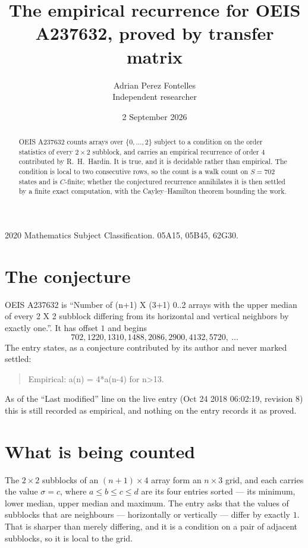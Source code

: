 \documentclass[11pt,a4paper]{article}
\title{The empirical recurrence for OEIS A237632, proved by transfer matrix}
\author{Adrian Perez Fontelles\\ \small Independent researcher}
\date{2 September 2026}
\theoremstyle{plain}
\theoremstyle{definition}
\begin{document}
\maketitle

\begin{abstract}
OEIS A237632 counts arrays over $\{0,\dots,2\}$ subject to a condition on the order
statistics of every $2\times2$ subblock, and carries an empirical recurrence of order
$4$ contributed by R.~H.~Hardin. It is true, and it is decidable rather than empirical.
The condition is local to two consecutive rows, so the count is a walk count on $S=702$
states and is $C$-finite; whether the conjectured recurrence annihilates it is then settled by
a finite exact computation, with the Cayley--Hamilton theorem bounding the work.
\end{abstract}

\noindent\small 2020 Mathematics Subject Classification. 05A15, 05B45, 62G30.\normalsize

\section{The conjecture}

OEIS A237632 is ``Number of (n+1) X (3+1) 0..2 arrays with the upper median of every 2 X 2 subblock differing from its horizontal and vertical neighbors by exactly one.''. It has offset $1$ and begins
\[
702, 1220, 1310, 1488, 2086, 2900, 4132, 5720,\ \dots
\]
The entry states, as a conjecture contributed by its author and never marked settled:
\begin{quote}
Empirical: a(n) = 4*a(n-4) for n>13.
\end{quote}
As of the ``Last modified'' line on the live entry (Oct 24 2018 06:02:19, revision 8) this is still
recorded as empirical, and nothing on the entry records it as proved.

\section{What is being counted}

The $2\times2$ subblocks of an $(n+1)\times4$ array form an
$n\times3$ grid, and each carries the value $\sigma=c$, where $a\le b\le c\le d$ are its four entries sorted --- its minimum, lower median, upper median and maximum. The entry asks that the values of
subblocks that are neighbours --- horizontally or vertically --- differ by exactly $1$.
That is sharper than merely differing, and it is a condition on a pair of adjacent subblocks,
so it is local to the grid.
\end{document}
